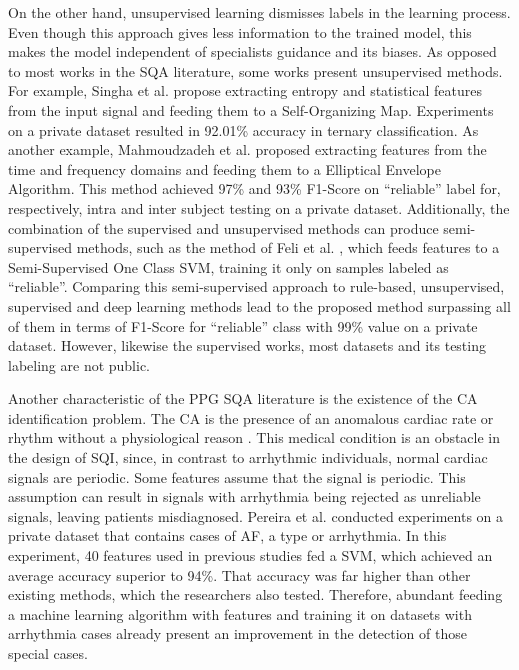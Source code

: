 On the other hand, unsupervised learning dismisses labels in the learning process. Even though this approach gives less information to the trained model, this makes the model independent of specialists guidance and its biases. As opposed to most works in the \gls{SQA} literature, some works present unsupervised methods. For example, Singha et al. \cite{ppg-sqa-4} propose extracting entropy and statistical features from the input signal and feeding them to a Self-Organizing Map. Experiments on a private dataset resulted in 92.01\% accuracy in ternary classification. As another example, Mahmoudzadeh et al. \cite{ppg-sqa-5} proposed extracting features from the time and frequency domains and feeding them to a Elliptical Envelope Algorithm. This method achieved 97\% and 93\% F1-Score on ``reliable'' label for, respectively, intra and inter subject testing on a private dataset. Additionally, the combination of the supervised and unsupervised methods can produce semi-supervised methods, such as the method of Feli et al. \cite{ppg-sqa-6}, which feeds features to a Semi-Supervised One Class \gls{SVM}, training it only on samples labeled as ``reliable''. Comparing this semi-supervised approach to rule-based, unsupervised, supervised and deep learning methods lead to the proposed method surpassing all of them in terms of F1-Score for ``reliable'' class with 99\% value on a private dataset. However, likewise the supervised works, most datasets and its testing labeling are not public.		

Another characteristic of the \gls{PPG} \gls{SQA} literature is the existence of the \gls{CA} identification problem. The \gls{CA} is the presence of an anomalous cardiac rate or rhythm without a physiological reason \cite{arrhythmia-1}. This medical condition is an obstacle in the design of \gls{SQI}, since, in contrast to arrhythmic individuals, normal cardiac signals are periodic. Some features assume that the signal is periodic. This assumption can result in signals with arrhythmia being rejected as unreliable signals, leaving patients  misdiagnosed. Pereira et al. \cite{arrhythmia-2} conducted experiments on a private dataset that contains cases of \gls{AF}, a type or arrhythmia. In this experiment, 40 features used in previous studies fed a \gls{SVM}, which achieved an average accuracy superior to 94\%. That accuracy was far higher than other existing methods, which the researchers also tested. Therefore, abundant feeding a machine learning algorithm with features and training it on datasets with arrhythmia cases already present an improvement in the detection of those special cases.


